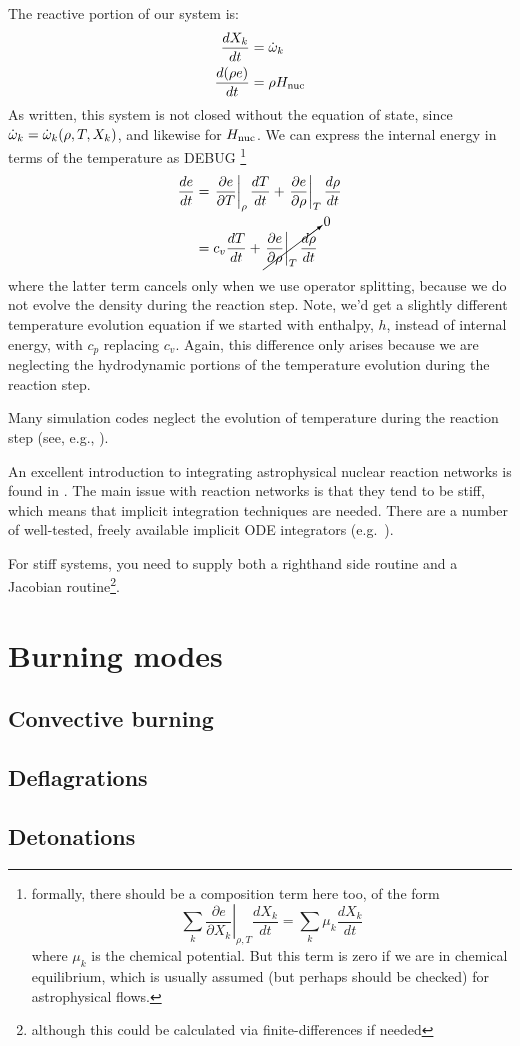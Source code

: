 The reactive portion of our system is:
\begin{align}
\frac{dX_k}{dt} &= {\dot{\omega}}_k \\
\frac{d(\rho e)}{dt} &= \rho {H_\mathrm{nuc}}
\end{align}
As written, this system is not closed without the equation of state,
since ${\dot{\omega}}_k = {\dot{\omega}}_k(\rho, T, X_k)$, and likewise for
${H_\mathrm{nuc}}$.  We can express the internal energy in terms of the
temperature as
\if DEBUG
\footnote{formally, there should be a composition term here too, of the
form
\[
\sum_k \left . \frac{\partial e}{\partial X_k} \right |_{\rho,T} \frac{dX_k}{dt}  =
      \sum_k \mu_k \frac{dX_k}{dt} 
\]
where $\mu_k$ is the chemical potential.  But this term is zero if we are in chemical
equilibrium, which is usually assumed (but perhaps should be checked) for astrophysical
flows.  
}
\fi
\begin{align}
\frac{de}{dt} &= \left . \frac{\partial e}{\partial T}\right |_\rho \frac{dT}{dt} +
                 \left . \frac{\partial e}{\partial \rho}\right |_T \frac{d\rho}{dt} \\
              &= c_v \frac{dT}{dt} + \cancelto{0}{\left . \frac{\partial e}{\partial \rho}\right |_T \frac{d\rho}{dt}}
\end{align}
where the latter term cancels only when we use operator splitting,
because we do not evolve the density during the reaction step.  Note,
we'd get a slightly different temperature evolution equation if we
started with enthalpy, $h$, instead of internal energy, with $c_p$
replacing $c_v$.  Again, this difference only arises because we are
neglecting the hydrodynamic portions of the temperature evolution
during the reaction step.

Many simulation codes neglect the evolution of temperature during the
reaction step (see, e.g., \cite{flash}).

An excellent introduction to integrating astrophysical nuclear
reaction networks is found in \cite{timmes_nets}.  The main issue with
reaction networks is that they tend to be stiff, which means that
implicit integration techniques are needed.  There are a number of
well-tested, freely available implicit ODE integrators
(e.g.~\cite{vode}).

For stiff systems, you need to supply both a righthand side routine
and a Jacobian routine\footnote{although this could be calculated via
  finite-differences if needed}.



\section{Burning modes}

\subsection{Convective burning}


\subsection{Deflagrations}


\subsection{Detonations}

